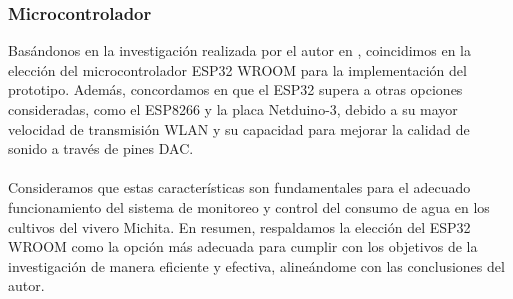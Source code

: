 

\subsubsection*{Microcontrolador}
Basándonos en la investigación realizada por el autor en \cite{verdezoto_arauz_implementacion_2023}, coincidimos en la elección del microcontrolador ESP32 WROOM para la implementación del prototipo. Además, concordamos en que el ESP32 supera a otras opciones consideradas, como el ESP8266 y la placa Netduino-3, debido a su mayor velocidad de transmisión WLAN y su capacidad para mejorar la calidad de sonido a través de pines DAC. 
\\
\\
Consideramos que estas características son fundamentales para el adecuado funcionamiento del sistema de monitoreo y control del consumo de agua en los cultivos del vivero Michita. En resumen, respaldamos la elección del ESP32 WROOM como la opción más adecuada para cumplir con los objetivos de la investigación de manera eficiente y efectiva, alineándome con las conclusiones del autor.

